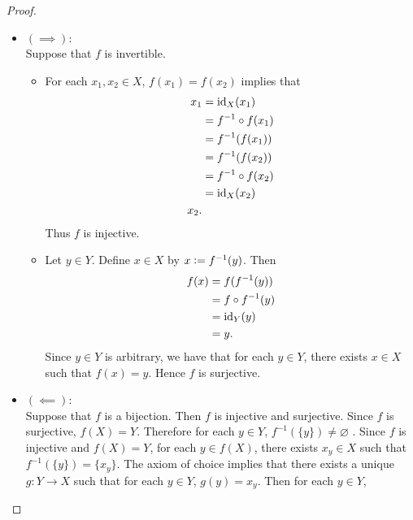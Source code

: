 \documentclass{book}
\begin{document}
	\begin{proof}
		\begin{itemize}
			\item $(\implies)$: \\
			Suppose that $f$ is invertible. 
			\begin{itemize}
				\item For each $x_1, x_2 \in X$, $f(x_1) = f(x_2)$ implies that 
				\begin{align*}
					x_1
					& = \operatorname{id}_X(x_1) \\
					& = f^{-1} \circ f(x_1) \\
					& = f^{-1}(f(x_1)) \\
					& = f^{-1}(f(x_2)) \\
					& = f^{-1} \circ f(x_2) \\
					& = \operatorname{id}_X(x_2) \\
					x_2.
				\end{align*}
				Thus $f$ is injective.
				\item Let $y \in Y$. Define $x \in X$ by $x \vcentcolon= f^{-1}(y)$. Then 
				\begin{align*}
					f(x)
					& = f(f^{-1}(y)) \\
					& = f \circ f^{-1}(y) \\
					& = \operatorname{id}_Y(y) \\
					& = y.
				\end{align*}
				Since $y \in Y$ is arbitrary, we have that for each $y \in Y$, there exists $x \in X$ such that $f(x) = y$. Hence $f$ is surjective.
			\end{itemize}
			\item $(\impliedby)$: \\
			Suppose that $f$ is a bijection. Then $f$ is injective and surjective. Since $f$ is surjective, $f(X) = Y$. Therefore for each $y \in Y$, $f^{-1}(\{y\}) \neq \varnothing$ . Since $f$ is injective and $f(X) = Y$, for each $y \in f(X)$, there exists $x_y \in X$ such that $f^{-1}(\{y\}) = \{x_y\}$. The axiom of choice  implies that there exists a unique $g:Y \rightarrow X$ such that for each $y \in Y$, $g(y) = x_y$. Then for each $y \in Y$, 

\end{itemize}
\end{proof}
\end{document}
